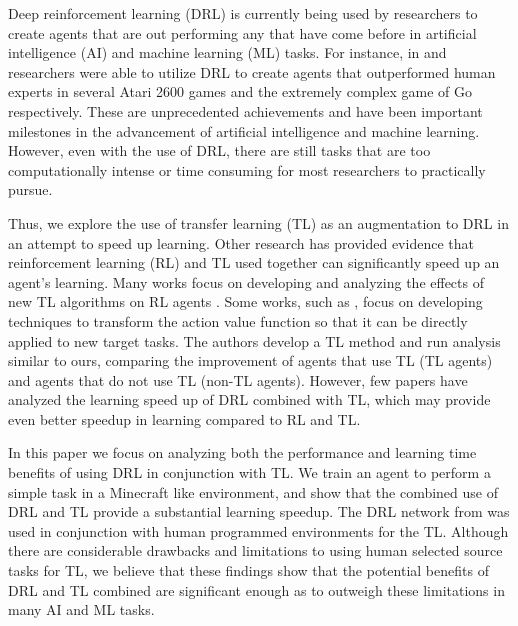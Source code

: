 \documentclass{llncs}
\begin{document}

Deep reinforcement learning (DRL) is currently being used by researchers to create agents that are out performing any that have come before in artificial intelligence (AI) and machine learning (ML) tasks.
For instance, in \citep{mnih2015human} and \citep{silver2016mastering} researchers were able to utilize DRL to create agents that outperformed human experts in several Atari 2600 games and the extremely complex game of Go respectively.
These are unprecedented achievements and have been important milestones in the advancement of artificial intelligence and machine learning.
However, even with the use of DRL, there are still tasks that are too computationally intense or time consuming for most researchers to practically pursue. 

Thus, we explore the use of transfer learning (TL) as an augmentation to DRL in an attempt to speed up learning. 
Other research has provided evidence that reinforcement learning (RL) and TL used together can significantly speed up an agent's learning. 
Many works focus on developing and analyzing the effects of new TL algorithms on RL agents \citep{taylor2007cross,taylor2008autonomous,ramon2007transfer}. 
Some works, such as \citep{taylor2007transfer}, focus on developing techniques to transform the action value function so that it can be directly applied to new target tasks.
The authors develop a TL method and run analysis similar to ours, comparing the improvement of agents that use TL (TL agents) and agents that do not use TL (non-TL agents).
However, few papers have analyzed the learning speed up of DRL combined with TL, which may provide even better speedup in learning compared to RL and TL. 

In this paper we focus on analyzing both the performance and learning time benefits of using DRL in conjunction with TL. 
We train an agent to perform a simple task in a Minecraft like environment, and show that the combined use of DRL and TL provide a substantial learning speedup.
The DRL network from \citep{mnih2015human} was used in conjunction with human programmed environments for the TL.
Although there are considerable drawbacks and limitations to using human selected source tasks for TL, we believe that these findings show that the potential benefits of DRL and TL combined are significant enough as to outweigh these limitations in many AI and ML tasks. 

\end{document}
